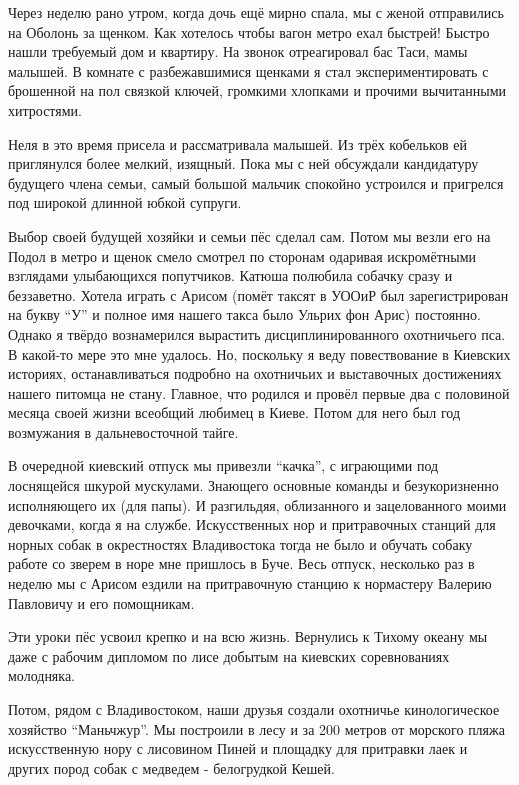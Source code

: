 Через неделю рано утром, когда дочь ещё мирно спала, мы с женой отправились на
Оболонь за щенком. Как хотелось чтобы вагон метро ехал быстрей! Быстро нашли
требуемый дом и квартиру. На звонок отреагировал бас Таси, мамы малышей. В
комнате с разбежавшимися щенками я стал экспериментировать с брошенной на пол
связкой ключей, громкими хлопками и прочими вычитанными хитростями. 

Неля в это время присела и рассматривала малышей. Из трёх кобельков ей
приглянулся более мелкий, изящный. Пока мы с ней обсуждали кандидатуру будущего
члена семьи, самый большой мальчик спокойно устроился и пригрелся под широкой
длинной юбкой супруги. 

Выбор своей будущей хозяйки и семьи пёс сделал сам. Потом мы везли его на Подол
в метро и щенок смело смотрел по сторонам одаривая искромётными взглядами
улыбающихся попутчиков. Катюша полюбила собачку сразу и беззаветно. Хотела
играть с Арисом (помёт таксят в УООиР был зарегистрирован на букву \enquote{У}
и полное имя нашего такса было Ульрих фон Арис) постоянно. Однако я твёрдо
вознамерился вырастить дисциплинированного охотничьего пса. В какой-то мере это
мне удалось. Но, поскольку я веду повествование в Киевских историях,
останавливаться подробно на охотничьих и выставочных достижениях нашего питомца
не стану. Главное, что родился и провёл первые два с половиной месяца своей
жизни всеобщий любимец в Киеве. Потом для него был год возмужания в
дальневосточной тайге. 

В очередной киевский отпуск мы привезли \enquote{качка}, с играющими под
лоснящейся шкурой мускулами. Знающего основные команды и безукоризненно
исполняющего их (для папы). И разгильдяя, облизанного и зацелованного моими
девочками, когда я на службе. Искусственных нор и притравочных станций для
норных собак в окрестностях Владивостока тогда не было и обучать собаку работе
со зверем в норе мне пришлось в Буче. Весь отпуск, несколько раз в неделю мы с
Арисом ездили на притравочную станцию к нормастеру Валерию Павловичу и его
помощникам.

Эти уроки пёс усвоил крепко и на всю жизнь. Вернулись к Тихому океану мы даже с
рабочим дипломом по лисе добытым на киевских соревнованиях молодняка. 

Потом, рядом с Владивостоком, наши друзья создали охотничье кинологическое
хозяйство \enquote{Маньчжур}. Мы построили в лесу и за 200 метров от морского
пляжа искусственную нору с лисовином Пиней и площадку для притравки лаек и
других пород собак с медведем - белогрудкой Кешей. 

